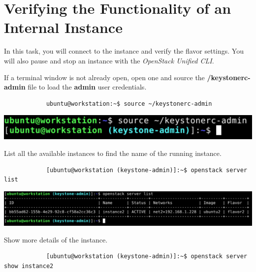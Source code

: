 \documentclass[letterpaper, 12pt]{article}
\begin{document}
\section{Verifying the Functionality of an Internal Instance}\label{sec:verifying-the-functionality-of-an-internal-instance}
In this task, you will connect to the instance and verify the flavor settings.
You will also pause and stop an instance with the \textit{OpenStack Unified CLI}.

\begin{enumerate}
    \begin{labstep}
        If a terminal window is not already open, open one and source the \textbf{\texttildemid/keystonerc-admin} file to load the \textbf{admin} user credentials.
        \begin{lstlisting}
            ubuntu@workstation:~$ source ~/keystonerc-admin
        \end{lstlisting}

        \begin{center}
            \includegraphics[width=\linewidth]{images/part5/step1.png}
        \end{center}
    \end{labstep}

    \begin{labstep}
        List all the available instances to find the name of the running instance.
        \begin{lstlisting}
            [ubuntu@workstation (keystone-admin)]:~$ openstack server list
        \end{lstlisting}

        \begin{center}
            \includegraphics[width=\linewidth]{images/part5/step2.png}
        \end{center}
    \end{labstep}

    \begin{labstep}
        Show more details of the instance.
        \begin{lstlisting}
            [ubuntu@workstation (keystone-admin)]:~$ openstack server show instance2
        \end{lstlisting}


\end{labstep}
\end{enumerate}
\end{document}
